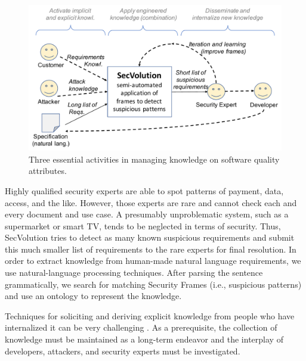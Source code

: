 \begin{figure}
    \centering
    \includegraphics[width=\columnwidth]{figs/nnnOben}
    \caption{Three essential activities in managing knowledge on software quality attributes.}
    \label{fig:nnnOben}
\end{figure}

Highly qualified security experts are able to spot patterns of payment, data, access, and the like. 
However, those experts are rare and cannot check each and every document and use case. 
A presumably unproblematic system, such as a supermarket or smart TV, tends to be neglected in terms of security. 
Thus, SecVolution tries to detect as many known suspicious requirements and submit this much smaller list of requirements to the rare experts for final resolution. 
In order to extract knowledge from human-made natural language requirements, we use natural-language processing techniques. 
After parsing the sentence grammatically, we search for matching Security Frames (i.e., suspicious patterns) and use an ontology to represent the knowledge. 


Techniques for soliciting and deriving explicit knowledge from  people who have internalized it can be very challenging \cite{Gaertner2014}. 
As a prerequisite, the %
collection of knowledge must be maintained as a long-term endeavor and the interplay of developers, attackers, and security experts must be investigated. 
